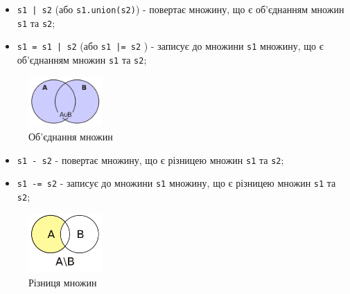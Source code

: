 \begin{frame}
\begin{itemize}
    \item \texttt{s1 | s2} (або \texttt{s1.union(s2)}) - повертає множину, що є об'єднанням множин \texttt{s1} та \texttt{s2};
  \item \texttt{s1 = s1 | s2} (або \texttt{s1 |= s2} ) - записує до множини \texttt{s1} множину, що є об'єднанням множин \texttt{s1} та \texttt{s2};
\end{itemize}
 \begin{figure}
\begin{center}
 \includegraphics[width=0.25\textwidth]{pictures/union.png}
\caption{Об'єднання множин}
\label{union} 
\end{center}
\end{figure} 
\end{frame}

\begin{frame}
\begin{itemize}
    \item \texttt{s1 - s2} - повертає множину, що є різницею множин \texttt{s1} та \texttt{s2};
  \item \texttt{s1 -= s2} - записує до множини \texttt{s1} множину, що є різницею множин \texttt{s1} та \texttt{s2};
\end{itemize}
 \begin{figure}
\begin{center}
 \includegraphics[width=0.25\textwidth]{pictures/subtract.png}
\caption{Різниця множин}
\label{subtract} 
\end{center}
\end{figure} 
\end{frame}

